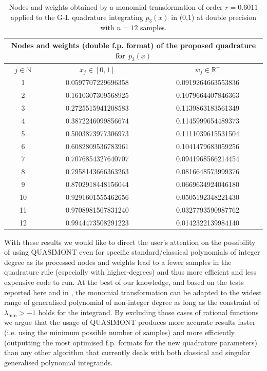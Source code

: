 \documentclass[a4paper, twosided]{book}
\begin{document}
\begin{table}[H]
\centering
\begin{tabular}{|c||c|c|}
\hline
\multicolumn{3}{|c|}{\textbf{Nodes and weights (double f.p. format) of the proposed quadrature for $p_3(x)$}} \\
\hline
$j\in\mathbb{N}$ & $x_j\in[0,1]$ & $w_j\in\mathbb{R}^+$ \\
\hline
1   &  0.0597707229696358   &  0.0919264663553836  \\
2   &  0.1610307309568925   &  0.1079664407846363  \\
3   &  0.2725515941208583   &  0.1139863183561349  \\
4   &  0.3872246099856674   &  0.1145999654489373  \\
5   &  0.5003873977306973   &  0.1111039615531504  \\
6   &  0.6082809536783961   &  0.1041479683059256  \\
7   &  0.7076854327640707   &  0.0941968566214454  \\
8   &  0.7958143666363263   &  0.0816648573999376  \\
9   &  0.8702918448156044   &  0.0669634924046180  \\
10   &  0.9291601555462656   &  0.0505192348221430  \\
11  &  0.9708981507831240   &  0.0327793590987762  \\
12  &  0.9944473508291223   &  0.0142322139984140  \\
\hline
\end{tabular}
  \caption{Nodes and weights obtained by a monomial transformation of order $r=0.6011$ applied to the G-L quadrature integrating $p_3(x)$ in (0,1) at double precision with $n=12$ samples.}
  \label{table2.3}
\end{table}

\noindent
With these results we would like to direct the user's attention on the possibility of using QUASIMONT even for specific standard/classical polynomials of integer degree as its processed nodes and weights lead to a fewer samples in the quadrature rule (especially with higher-degrees) and thus more efficient and less expensive code to run. At the best of our knowledge, and based on the tests reported here and in \cite{Lombardi09, Lombardi21}, the monomial transformation can be adapted to the widest range of generalised polynomial of non-integer degree as long as the constraint of $\lambda_{\text{min}}>-1$ holds for the integrand. By excluding those cases of rational functions we argue that the usage of QUASIMONT produces more accurate results faster (i.e. using the minimum possible number of samples) and more efficiently (outputting the most optimised f.p. formats for the new quadrature parameters) than any other algorithm that currently deals with both classical and singular generalised polynomial integrands.
\end{document}
